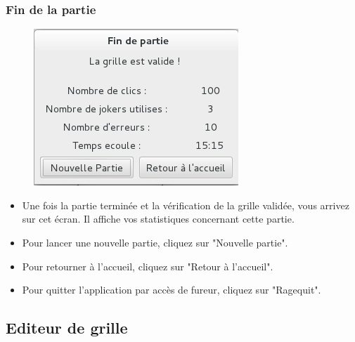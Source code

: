 \documentclass[a4paper, 12pt, twoside]{article}
\begin{document}
\subsubsection{Fin de la partie}

\begin{figure}[H]
  \center
  \includegraphics[scale=0.6]{fin_partie.png}
  \label{fin_partie}
\end{figure}

\begin{itemize}\setlength{\itemsep}{1mm}
 \item Une fois la partie terminée et la vérification de la grille validée, vous arrivez sur cet écran. Il affiche vos statistiques concernant cette partie.
 \item Pour lancer une nouvelle partie, cliquez sur "Nouvelle partie".
\item Pour retourner à l'accueil, cliquez sur "Retour à l'accueil".
 \item Pour quitter l'application par accès de fureur, cliquez sur "Ragequit".
\end{itemize}

\subsection{Editeur de grille}
\end{document}
